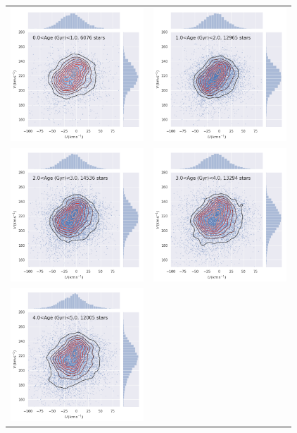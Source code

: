 \begin{figure}[htbp]
   \centering
\begin{tabular}{cc}
\includegraphics[width=5cm]{fig/UV/0to1Gyr_z0.1kpc_hist2d.png}&
\includegraphics[width=5cm]{fig/UV/1to2Gyr_z0.1kpc_hist2d.png}\\
\includegraphics[width=5cm]{fig/UV/2to3Gyr_z0.1kpc_hist2d.png}&
\includegraphics[width=5cm]{fig/UV/3to4Gyr_z0.1kpc_hist2d.png}\\
\includegraphics[width=5cm]{fig/UV/4to5Gyr_z0.1kpc_hist2d.png}&

\end{tabular}
\end{figure}
